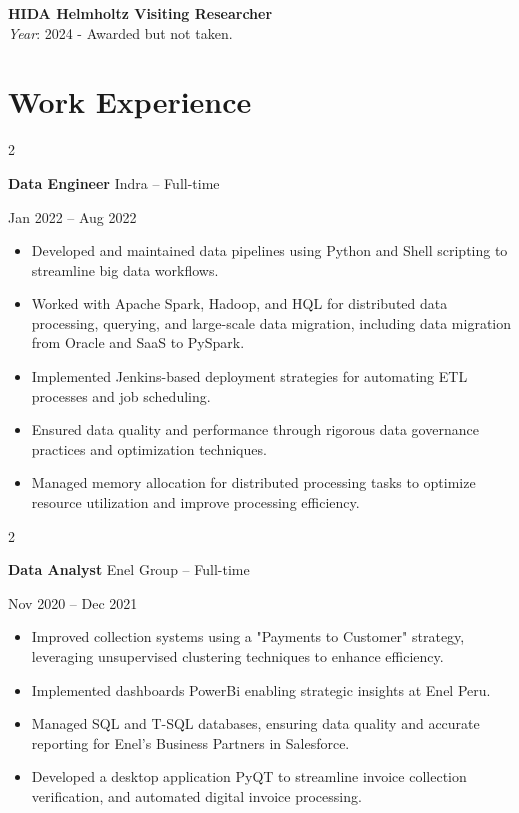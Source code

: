 \documentclass[10pt, letterpaper]{article}
\newenvironment{highlights}{
    \begin{itemize}[
        topsep=0.10 cm,
        parsep=0.10 cm,
        partopsep=0pt,
        itemsep=0pt,
        leftmargin=0 cm + 10pt
    ]
}{
    \end{itemize}
} %
\newenvironment{twocolentry}[2][]{
    \onecolentry
    \def\secondColumn{#2}
    \setcolumnwidth{\fill, 4.5 cm}
    \begin{paracol}{2}
}{
    \switchcolumn \raggedleft \secondColumn
    \end{paracol}
    \endonecolentry
} %
\begin{document}
        \vspace{0.5em} %
        
        \noindent \textbf{HIDA Helmholtz Visiting Researcher} \\
        \textit{Year}: 2024 - Awarded but not taken.

        
\section*{Work Experience}

\begin{twocolentry}{Jan 2022 – Aug 2022}
    \textbf{Data Engineer} \textbar Indra – Full-time
\end{twocolentry}
\begin{highlights}
    \item Developed and maintained data pipelines using Python and Shell scripting to streamline big data workflows.
    \item Worked with Apache Spark, Hadoop, and HQL for distributed data processing, querying, and large-scale data migration, including data migration from Oracle and SaaS to PySpark.
    \item Implemented Jenkins-based deployment strategies for automating ETL processes and job scheduling.
    \item Ensured data quality and performance through rigorous data governance practices and optimization techniques.
    \item Managed memory allocation for distributed processing tasks to optimize resource utilization and improve processing efficiency.
\end{highlights}


\begin{twocolentry}{Nov 2020 – Dec 2021}
    \textbf{Data Analyst} \textbar Enel Group – Full-time
\end{twocolentry}
\begin{highlights}
    \item Improved collection systems using a "Payments to Customer" strategy, leveraging unsupervised clustering techniques to enhance efficiency.
    \item Implemented dashboards PowerBi enabling strategic insights at Enel Peru.
    \item Managed SQL and T-SQL databases, ensuring data quality and accurate reporting for Enel's Business Partners in Salesforce.
    \item Developed a desktop application PyQT to streamline invoice collection verification, and automated digital invoice processing.
\end{highlights}
\end{document}
